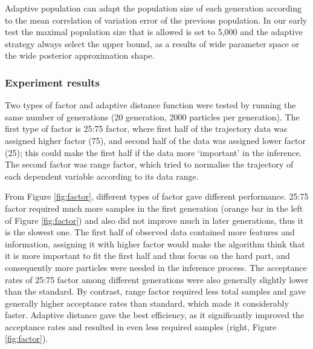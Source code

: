 Adaptive population \cite{population} can adapt the population size of each generation according to the mean correlation of variation error of the previous population. In our early test the maximal population size that is allowed is set to 5,000 and the adaptive strategy always select the upper bound, as a results of wide parameter space or the wide posterior approximation shape.



\subsubsection{Experiment results}


Two types of factor and adaptive distance function were tested by running the same number of generations (20 generation, 2000 particles per generation). The first type of factor is 25:75  factor, where first half of the trajectory data was assigned higher factor (75), and second half of the data was assigned lower factor (25); this could make the first half if the data more `important' in the inference. The second factor was range factor, which tried to normalise the trajectory of each dependent variable according to its data range.

From Figure \ref{fig:factor}, different types of factor gave different performance. 25:75 factor required much more samples in the first generation (orange bar in the left of Figure \ref{fig:factor}) and also did not improve much in later generations, thus it is the slowest one. The first half of observed data contained more features and information, assigning it with higher factor would make the algorithm think that it is more important to fit the first half and thus focus on the hard part, and consequently more particles were needed in the inference process. The acceptance rates of 25:75 factor among different generations were also generally slightly lower than the standard. By contrast, range factor required less total samples and gave generally higher acceptance rates than standard, which made it considerably faster. Adaptive distance gave the best efficiency, as it significantly improved the acceptance rates and resulted in even less required samples (right, Figure \ref{fig:factor}).

